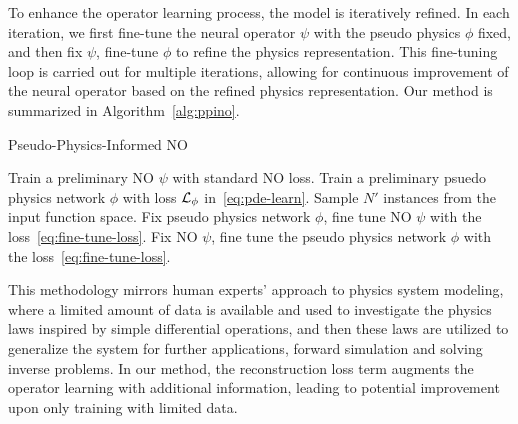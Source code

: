 
To enhance the operator learning process, the model is iteratively refined. In each iteration, we first fine-tune the neural operator $\psi$ with the pseudo physics $\phi$ fixed, and then fix $\psi$,  fine-tune  $\phi$ to refine the physics representation. This fine-tuning loop is carried out for multiple iterations, allowing for continuous improvement of the neural operator based on the refined physics representation. Our method is summarized in Algorithm~\ref{alg:ppino}.


\begin{algorithm}[H]
  \caption{Pseudo-Physics-Informed NO}
  \begin{algorithmic}[1]\label{alg:train}
        \STATE Train a preliminary NO $\psi$ with standard NO loss.
        \STATE Train a preliminary psuedo physics network $\phi$ with loss ${\mathcal{L}}_\phi$ in~\eqref{eq:pde-learn}.
        \REPEAT
        \STATE Sample $N'$ instances from the input function space.
        \STATE Fix pseudo physics network $\phi$, fine tune NO $\psi$ with the loss~\eqref{eq:fine-tune-loss}. %
        \STATE Fix NO $\psi$, fine tune the pseudo physics network $\phi$ with the loss~\eqref{eq:fine-tune-loss}.  %
  \end{algorithmic}\label{alg:ppino}
\end{algorithm}

This methodology mirrors  human experts' approach to physics system modeling, where a limited amount of data is available and used to investigate the physics laws inspired by simple differential operations,  
and then these laws are utilized to generalize the system for further applications, \eg forward simulation and solving inverse problems. In our method, the  reconstruction loss term augments the operator learning with additional information, leading to potential improvement upon only training with limited data.


